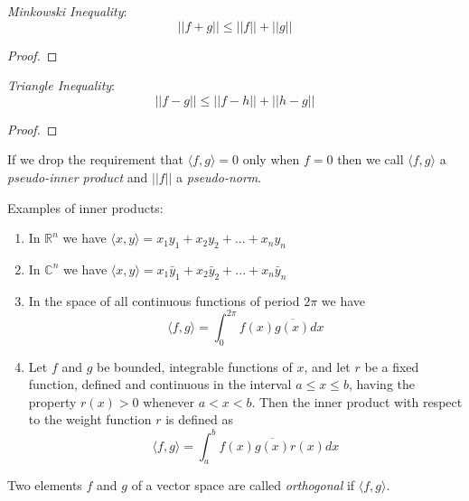 \documentclass[conference,12pt,onecolumn,compsoc]{IEEEtran}
\begin{document}
\begin{proposition}
\emph{Minkowski Inequality}:
\begin{equation}
||f+g|| \leq ||f|| + ||g||
\label{Minkowski}
\end{equation}
\end{proposition}
\begin{proof}

\end{proof}

\begin{proposition}
\emph{Triangle Inequality}:
\begin{equation}
||f-g|| \leq ||f-h|| + ||h-g||
\label{triangle}
\end{equation}
\end{proposition}
\begin{proof}

\end{proof}

If we drop the requirement that $\langle f,g\rangle = 0$ only when $f = 0$ then we call $\langle f,g\rangle$ a \emph{pseudo-inner product} and $||f||$ a \emph{pseudo-norm}. 

Examples of inner products:
\begin{enumerate}[(1)]
	\item In $\mathbb{R}^n$ we have $\langle x,y\rangle = x_1y_1 + x_2y_2 + ... + x_ny_n$
	\item In $\mathbb{C}^n$ we have $\langle x,y\rangle = x_1\bar{y}_1 + x_2\bar{y}_2 + ... + x_n\bar{y}_n$
	\item In the space of all continuous functions of period $2\pi$ we have \begin{equation}
	\langle f,g\rangle = \int_0^{2\pi} f(x)\overline{g(x)}dx
	\nonumber
	\end{equation}
	\item Let $f$ and $g$ be bounded, integrable functions of $x$, and let $r$ be a fixed function, defined and continuous in the interval $a\leq x \leq b$, having the property $r(x)>0$ whenever $a<x<b$. Then the inner product with respect to the weight function $r$ is defined as
	\begin{equation}
	\langle f,g\rangle = \int_a^b f(x)\overline{g(x)}r(x)dx
	\nonumber
	\end{equation}
\end{enumerate}

\begin{definition}
Two elements $f$ and $g$ of a vector space are called \emph{orthogonal} if $\langle f,g\rangle$.
\end{definition}
\end{document}
